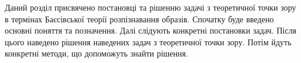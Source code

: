 Даний розділ присвячено постановці та рішенню задачі з теоретичної точки зору
в термінах Баєсівської теорії розпізнавання образів.
Спочатку буде введено основні поняття та позначення.
Далі слідують конкретні постановки задач.
Після цього наведено рішення наведених задач з теоретичної точки зору.
Потім йдуть конкретні методи, що допоможуть знайти рішення.
